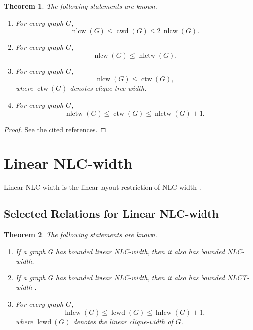 \documentclass[10pt]{book}
\newtheorem{theorem}{Theorem}[section]
\theoremstyle{definition}
\begin{document}
\begin{theorem}
The following statements are known.
\begin{enumerate}
    \item For every graph \(G\),
    \[
    \operatorname{nlcw}(G)\leq \operatorname{cwd}(G)\leq 2\,\operatorname{nlcw}(G).
    \]
    \cite{39}

    \item For every graph \(G\),
    \[
    \operatorname{nlcw}(G)\leq \operatorname{nlctw}(G).
    \]
    \cite{39}

    \item For every graph \(G\),
    \[
    \operatorname{nlcw}(G)\leq \operatorname{ctw}(G),
    \]
    where \(\operatorname{ctw}(G)\) denotes clique-tree-width. \cite{39}

    \item For every graph \(G\),
    \[
    \operatorname{nlctw}(G)\leq \operatorname{ctw}(G)\leq \operatorname{nlctw}(G)+1.
    \]
    \cite{39}
\end{enumerate}
\end{theorem}

\begin{proof}
See the cited references.
\end{proof}

\section{Linear NLC-width}

Linear NLC-width is the linear-layout restriction of NLC-width \cite{39}.

\subsection{Selected Relations for Linear NLC-width}

\begin{theorem}
The following statements are known.
\begin{enumerate}
    \item If a graph \(G\) has bounded linear NLC-width, then it also has bounded NLC-width.

    \item If a graph \(G\) has bounded linear NLC-width, then it also has bounded NLCT-width \cite{39}.

    \item For every graph \(G\),
    \[
    \operatorname{lnlcw}(G)\leq \operatorname{lcwd}(G)\leq \operatorname{lnlcw}(G)+1,
    \]
    where \(\operatorname{lcwd}(G)\) denotes the linear clique-width of \(G\). \cite{39}
\end{enumerate}
\end{theorem}
\end{document}
